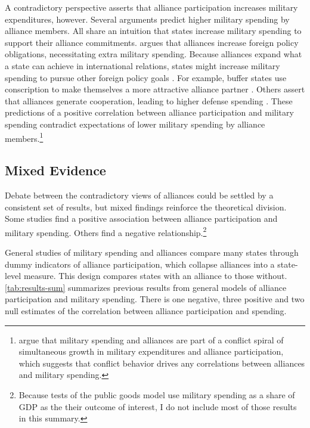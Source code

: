 \documentclass[12pt]{article}
\begin{document}
A contradictory perspective asserts that alliance participation increases military expenditures, however. 
Several arguments predict higher military spending by alliance members.
All share an intuition that states increase military spending to support their alliance commitments. 
\citet{Diehl1994} argues that alliances increase foreign policy obligations, necessitating extra military spending.
Because alliances expand what a state can achieve in international relations, states might increase military spending to pursue other foreign policy goals \citep{MorganPalmer2006}.
For example, buffer states use conscription to make themselves a more attractive alliance partner \citep{Horowitzetal2017}.
Others assert that alliances generate cooperation, leading to higher defense spending \citep{Palmer1990, QuirozFlores2011}. 
These predictions of a positive correlation between alliance participation and military spending contradict expectations of lower military spending by alliance members.\footnote{
\citet{SeneseVasquez2008} argue that military spending and alliances are part of a conflict spiral of simultaneous growth in military expenditures and alliance participation, which suggests that conflict behavior drives any correlations between alliances and military spending. 
}


\subsection*{Mixed Evidence} 


Debate between the contradictory views of alliances could be settled by a consistent set of results, but mixed findings reinforce the theoretical division.
Some studies find a positive association between alliance participation and military spending. 
Others find a negative relationship.\footnote{
Because tests of the public goods model use military spending as a share of GDP as the their outcome of interest, I do not include most of those results in this summary.} 


General studies of military spending and alliances compare many states through dummy indicators of alliance participation, which collapse alliances into a state-level measure. 
This design compares states with an alliance to those without.
\autoref{tab:results-sum} summarizes previous results from general models of alliance participation and military spending. 
There is one negative, three positive and two null estimates of the correlation between alliance participation and spending. 
\end{document}
